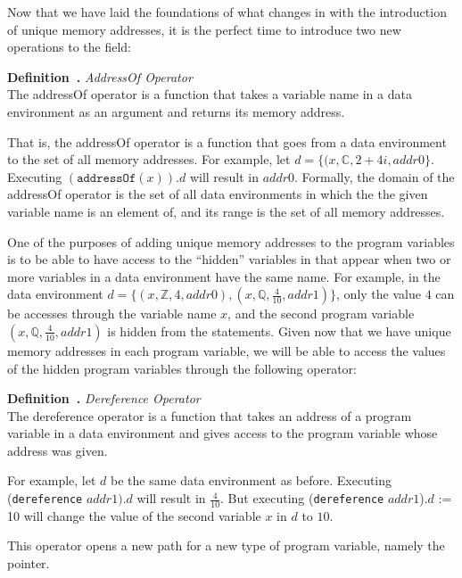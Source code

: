 \documentclass[11pt]{article}
\newcounter{definition}
\newenvironment{definition}[1][]{\stepcounter{definition}\par\medskip\noindent
\textbf{Definition~\thesection.\thedefinition #1} \rmfamily}{}
\newcounter{example}
\newcounter{result}
\begin{document}
Now that we have laid the foundations of what changes in \cite{baber} with the introduction of unique memory addresses, it is the perfect time to introduce two new operations to the field:

\begin{definition} \emph{AddressOf Operator} \\
The addressOf operator is a function that takes a variable name in a data environment as an argument and returns its memory address.
\medskip
\end{definition}

That is, the addressOf operator is a function that goes from a data environment to the set of all memory addresses. For example, let $d=\{(x,\mathbb{C},2+4i,addr0\}$. Executing $(\texttt{addressOf}(x)).d$ will result in $addr0$. Formally, the domain of the addressOf operator is the set of all data environments in which the the given variable name is an element of, and its range is the set of all memory addresses.

One of the purposes of adding unique memory addresses to the program variables is to be able to have access to the ``hidden'' variables in \cite{baber} that appear when two or more variables in a data environment have the same name. For example, in the data environment $d=\{(x,\mathbb{Z},4,addr0),(x,\mathbb{Q},\frac{4}{10},addr1)\}$, only the value $4$ can be accesses through the variable name $x$, and the second program variable $(x,\mathbb{Q},\frac{4}{10},addr1)$ is hidden from the statements. Given now that we have unique memory addresses in each program variable, we will be able to access the values of the hidden program variables through the following operator:

\begin{definition} \emph{Dereference Operator} \\
The dereference operator is a function that takes an address of a program variable in a data environment and gives access to the program variable whose address was given. \medskip
\end{definition}

For example, let $d$ be the same data environment as before. Executing (\texttt{dereference} $addr1).d$ will result in $\frac{4}{10}$. But executing (\texttt{dereference} $addr1$)$.d$ := 10 will change the value of the second variable $x$ in $d$ to $10$.

This operator opens a new path for a new type of program variable, namely the pointer.
\end{document}
